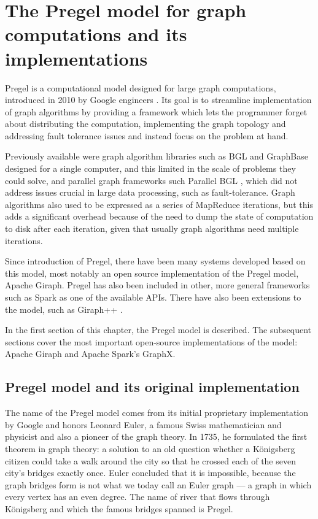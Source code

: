 
\chapter{The Pregel model for graph computations and its implementations}\label{r:pregel}

Pregel is a computational model designed for large graph computations, introduced in 2010 by Google engineers \cite{pregel}. Its goal is to streamline implementation of graph algorithms by providing a framework which lets the programmer forget about distributing the computation, implementing the graph topology and addressing fault tolerance issues and instead focus on the problem at hand.

Previously available were graph algorithm libraries such as BGL \cite{bgl} and GraphBase \cite{GraphBase} designed for a single computer, and this limited in the scale of problems they could solve, and parallel graph frameworks such Parallel BGL \cite{parallelbgl}, which did not address issues crucial in large data processing, such as fault-tolerance. Graph algorithms also used to be expressed as a series of MapReduce iterations, but this adds a significant overhead because of the need to dump the state of computation to disk after each iteration, given that usually graph algorithms need multiple iterations.

Since introduction of Pregel, there have been many systems developed based on this model, most notably an open source implementation of the Pregel model, Apache Giraph. Pregel has also been included in other, more general frameworks such as Spark as one of the available APIs. There have also been extensions to the model, such as Giraph++ \cite{giraphpp}.

In the first section of this chapter, the Pregel model is described. The subsequent sections cover the most important open-source implementations of the model: Apache Giraph and Apache Spark's GraphX.

\section{Pregel model and its original implementation}

The name of the Pregel model comes from its initial proprietary implementation by Google and honors Leonard Euler, a famous Swiss mathematician and physicist and also a pioneer of the graph theory. In 1735, he formulated the first theorem in graph theory: a solution to an old question whether a Königsberg citizen could take a walk around the city so that he crossed each of the seven city's bridges exactly once. Euler concluded that it is impossible, because the graph bridges form is not what we today call an Euler graph --- a graph in which every vertex has an even degree. The name of river that flows through Königsberg and which the famous bridges spanned is Pregel.

